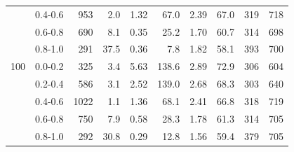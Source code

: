 \begin{tabular}{@{}llrrrrrrrr@{}}
 & 0.4-0.6 & 953 & 2.0 & 1.32 & 67.0 & 2.39 & 67.0 & 319 & 718 \\
 & 0.6-0.8 & 690 & 8.1 & 0.35 & 25.2 & 1.70 & 60.7 & 314 & 698 \\
 & 0.8-1.0 & 291 & 37.5 & 0.36 & 7.8 & 1.82 & 58.1 & 393 & 700 \\
\midrule
100 & 0.0-0.2 & 325 & 3.4 & 5.63 & 138.6 & 2.89 & 72.9 & 306 & 604 \\
 & 0.2-0.4 & 586 & 3.1 & 2.52 & 139.0 & 2.68 & 68.3 & 303 & 640 \\
 & 0.4-0.6 & 1022 & 1.1 & 1.36 & 68.1 & 2.41 & 66.8 & 318 & 719 \\
 & 0.6-0.8 & 750 & 7.9 & 0.58 & 28.3 & 1.78 & 61.3 & 314 & 705 \\
 & 0.8-1.0 & 292 & 30.8 & 0.29 & 12.8 & 1.56 & 59.4 & 379 & 705 \\
\bottomrule
\end{tabular}
